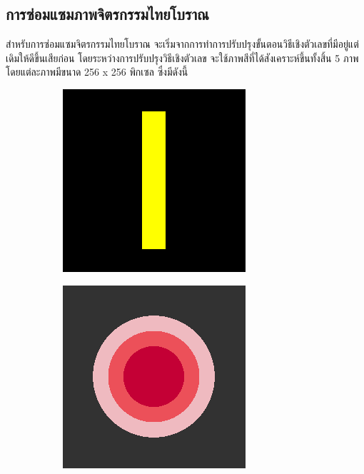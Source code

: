 \documentclass[hidelinks, a4paper,12pt]{article}
\numberwithin{equation}{section}							%
\numberwithin{equation}{section}
\begin{document}
{	\subsection{การซ่อมแซมภาพจิตรกรรมไทยโบราณ}
	\hspace{1cm} สำหรับการซ่อมแซมจิตรกรรมไทยโบราณ จะเริ่มจากการทำการปรับปรุงขั้นตอนวิธีเชิงตัวเลขที่มีอยู่แต่เดิมให้ดีขึ้นเสียก่อน โดยระหว่างการปรับปรุงวิธีเชิงตัวเลข จะใช้ภาพสีที่ได้สังเคราะห์ขึ้นทั้งสิ้น 5 ภาพ โดยแต่ละภาพมีขนาด 256 x 256 พิกเซล ซึ่งมีดังนี้
	\begin{figure}[H]
		\centering
		\begin{subfigure}{0.4\linewidth}
			\centering
			\includegraphics[width=0.8\linewidth]{images/image_inpaint_synthetic/case01-original.png}
		\end{subfigure}
		\begin{subfigure}{0.4\linewidth}
			\centering
			\includegraphics[width=0.8\linewidth]{images/image_inpaint_synthetic/case02-original.png}

\end{subfigure}
\end{figure}}
\end{document}
